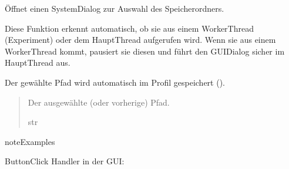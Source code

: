 \documentclass[letterpaper,10pt,english]{sphinxmanual}
\begin{document}
\begin{fulllineitems}
\begin{fulllineitems}
\end{fulllineitems}


\begin{fulllineitems}
\label{\detokenize{modulab/export_manager:modules.export.ExportManager.ExportManager.select_directory_dialog}}
\pysigstartsignatures
\pysiglinewithargsret
{}
{}
{}
\pysigstopsignatures
\sphinxAtStartPar
Öffnet einen System\sphinxhyphen{}Dialog zur Auswahl des Speicherordners.

\sphinxAtStartPar
{}
Diese Funktion erkennt automatisch, ob sie aus einem Worker\sphinxhyphen{}Thread (Experiment)
oder dem Haupt\sphinxhyphen{}Thread aufgerufen wird. Wenn sie aus einem Worker\sphinxhyphen{}Thread kommt,
pausiert sie diesen und führt den GUI\sphinxhyphen{}Dialog sicher im Haupt\sphinxhyphen{}Thread aus.

\sphinxAtStartPar
Der gewählte Pfad wird automatisch im Profil gespeichert ().
\begin{quote}\begin{description}
\sphinxAtStartPar
Der ausgewählte (oder vorherige) Pfad.

\sphinxAtStartPar
str

\end{description}\end{quote}

\begin{sphinxadmonition}{note}{Examples}

\sphinxAtStartPar
Button\sphinxhyphen{}Click Handler in der GUI:

\begin{sphinxVerbatim}[commandchars=\\\{\}]
      
\end{sphinxVerbatim}
\end{sphinxadmonition}


\end{fulllineitems}
\end{fulllineitems}
\end{document}
